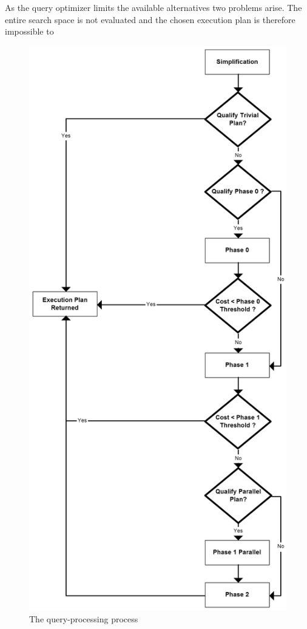 \documentclass{cslthse-msc}
\begin{document}
As the query optimizer limits the available alternatives two problems arise. The entire search space is not evaluated and the chosen execution plan is therefore impossible to 
\begin{figure}[H] 
\begin{center}
    \includegraphics[scale=0.3]{Pictures/Optimization-process.png}
  \end{center}
  \vspace{-20pt}
  \caption{The query-processing process}
  \label{fig:qpp}
  \vspace{-10pt}
\end{figure} 
\end{document}
